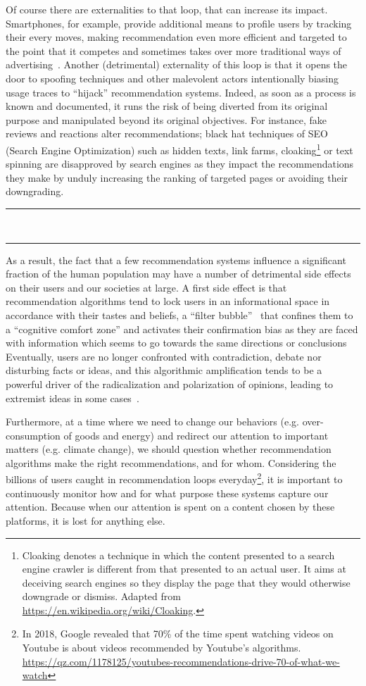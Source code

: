 \documentclass[10pt]{article}
\newcommand*\sepline{%
  \begin{center}
    \rule[1ex]{.17\textwidth}{.5pt}~{\LARGE\ding{104}}~\rule[1ex]{.17\textwidth}{.5pt}
  \end{center}}
\begin{document}
Of course there are externalities to that loop, that can increase its impact.
Smartphones, for example, provide additional means to profile users by tracking their every moves, making recommendation even more efficient and targeted to the point that it competes and sometimes takes over more traditional ways of advertising~\cite{the_economic_times_no_2017}.
%
Another (detrimental) externality of this loop is that it opens the door to spoofing techniques and other malevolent actors intentionally biasing usage traces to ``hijack'' recommendation systems. Indeed, as soon as a process is known and documented, it runs the risk of being diverted from its original purpose and manipulated beyond its original objectives. 
For instance, fake reviews and reactions alter recommendations; black hat techniques of SEO (Search Engine Optimization) such as hidden texts, link farms, cloaking\footnote{Cloaking denotes a technique in which the content presented to a search engine crawler is different from that presented to an actual user. It aims at deceiving search engines so they display the page that they would otherwise downgrade or dismiss. Adapted from \url{https://en.wikipedia.org/wiki/Cloaking}.} or text spinning are disapproved by search engines as they impact the recommendations they make by unduly increasing the ranking of targeted pages or avoiding their downgrading.

\sepline

As a result, the fact that a few recommendation systems influence a significant fraction of the human population may have a number of detrimental side effects on their users and our societies at large.
A first side effect is that recommendation algorithms tend to lock users in an informational space in accordance with their tastes and beliefs, a ``filter bubble''~\cite{pariser2011filter} that confines them to a ``cognitive comfort zone'' and activates their confirmation bias as they are faced with information which seems to go towards the same directions or conclusions~\cite{sasahara_social_2021,kitchens_understanding_2020}
Eventually, users are no longer confronted with contradiction, debate nor disturbing facts or ideas, and
this algorithmic amplification tends to be a powerful driver of the radicalization and polarization of opinions, leading to extremist ideas in some cases~\cite{whittaker_recommender_2021}.

Furthermore, at a time where we need to change our behaviors (e.g. over-consumption of goods and energy) and redirect our attention to important matters (e.g. climate change), we should question whether recommendation algorithms make the right recommendations, and for whom.
Considering the billions of users caught in recommendation loops everyday\footnote{In 2018, Google revealed that 70\% of the time spent watching videos on Youtube is about videos recommended by Youtube's algorithms. \url{https://qz.com/1178125/youtubes-recommendations-drive-70-of-what-we-watch}}, it is important to continuously monitor how and for what purpose these systems capture our attention. Because when our attention is spent on a content chosen by these platforms, it is lost for anything else.
\end{document}
